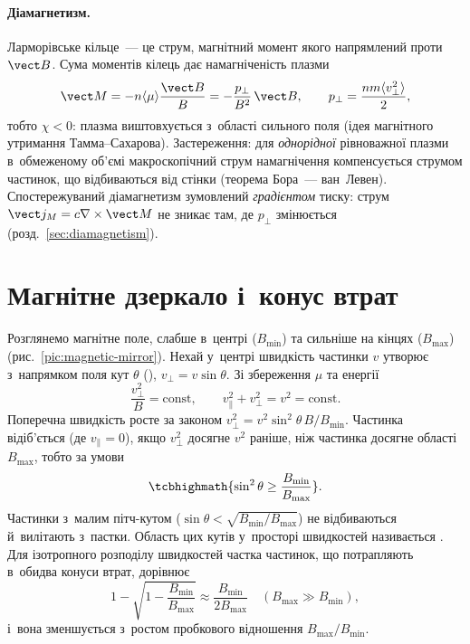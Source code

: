 \paragraph{Діамагнетизм.} Ларморівське кільце~--- це струм, магнітний момент якого напрямлений проти $\vect B$.
Сума моментів кілець дає намагніченість плазми
\[\vect M=-n\langle\mu\rangle\frac{\vect B}{B}=-\frac{p_\perp}{B^2}\,\vect B,\qquad p_\perp=\frac{nm\langle v_\perp^2\rangle}2,\]
тобто $\chi<0$: плазма виштовхується з~області сильного поля (ідея магнітного утримання Тамма--Сахарова).
Застереження: для \emph{однорідної} рівноважної плазми в~обмеженому об'ємі макроскопічний
струм намагнічення компенсується струмом частинок, що відбиваються від стінки (теорема Бора~--- ван~Левен).
Спостережуваний діамагнетизм зумовлений \emph{градієнтом} тиску: струм
$\vect j_M=c\nabla\times\vect M$ не зникає там, де $p_\perp$ змінюється (розд.~\ref{sec:diamagnetism}).

\section{Магнітне дзеркало і~конус втрат}\label{sec:magnetic-mirror}

Розглянемо магнітне поле, слабше в~центрі ($B_{\min}$) та сильніше на кінцях ($B_{\max}$)
(рис.~\ref{pic:magnetic-mirror}). Нехай у~центрі швидкість частинки $v$ утворює
з~напрямком поля кут $\theta$ (), $v_\perp=v\sin\theta$. Зі збереження
$\mu$ та енергії
\begin{equation*}
	\frac{v_\perp^2}{B}=\mathrm{const},\qquad v_\parallel^2+v_\perp^2=v^2=\mathrm{const}.
\end{equation*}
Поперечна швидкість росте за законом $v_\perp^2=v^2\sin^2\theta\,B/B_{\min}$. Частинка
відіб'ється (де $v_\parallel=0$), якщо $v_\perp^2$ досягне $v^2$ раніше, ніж частинка
досягне області $B_{\max}$, тобто за умови
\begin{equation}\label{eq:mirror-condition}
	\tcbhighmath{\sin^2\theta\geq\frac{B_{\min}}{B_{\max}}}.
\end{equation}
Частинки з~малим пітч-кутом ($\sin\theta<\sqrt{B_{\min}/B_{\max}}$) не відбиваються
й~вилітають з~пастки. Область цих кутів у~просторі швидкостей називається . Для ізотропного розподілу швидкостей частка частинок, що потрапляють в~обидва
конуси втрат, дорівнює
\begin{equation*}
	1-\sqrt{1-\frac{B_{\min}}{B_{\max}}}\approx\frac{B_{\min}}{2B_{\max}}\quad(B_{\max}\gg B_{\min}),
\end{equation*}
і~вона зменшується з~ростом пробкового відношення $B_{\max}/B_{\min}$.


